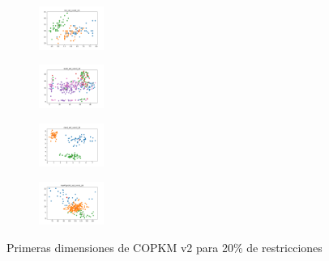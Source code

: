 \begin{figure}[H]
\begin{subfigure}
    \end{subfigure}
    \hfill
    \begin{subfigure}
        \centering
        \includegraphics[width=0.234\textwidth]{img/copkm2/iris_set_const_20_3773969821_clust.png}
    \end{subfigure}
    \hfill
    \begin{subfigure}
        \centering
        \includegraphics[width=0.234\textwidth]{img/copkm2/ecoli_set_const_20_3773969821_clust.png}
    \end{subfigure}
    \hfill
    \begin{subfigure}
        \centering
        \includegraphics[width=0.234\textwidth]{img/copkm2/rand_set_const_20_3773969821_clust.png}
    \end{subfigure}
    \hfill
    \begin{subfigure}
        \centering
        \includegraphics[width=0.234\textwidth]{img/copkm2/newthyroid_set_const_20_3773969821_clust.png}
    \end{subfigure}
    \caption{Primeras dimensiones de COPKM v2 para 20\% de restricciones}
\end{figure}

\vspace*{\fill}
\newpage